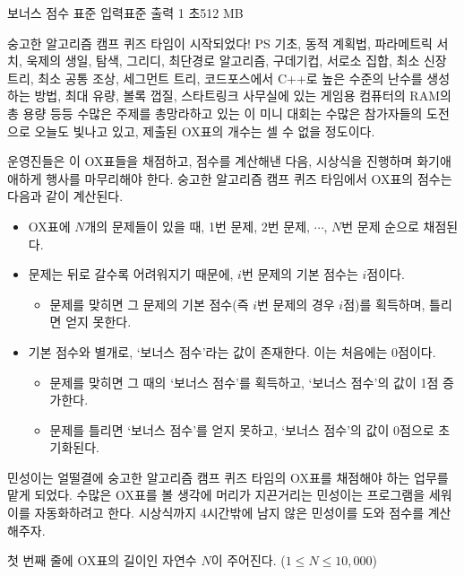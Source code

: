 \begin{problem}{보너스 점수}
    {표준 입력}{표준 출력}
    {1 초}{512 MB}{}
    
    숭고한 알고리즘 캠프 퀴즈 타임이 시작되었다! PS 기초, 동적 계획법, 파라메트릭 서치, 욱제의 생일, 탐색, 그리디, 최단경로 알고리즘, 구데기컵, 서로소 집합, 최소 신장 트리, 최소 공통 조상, 세그먼트 트리, 코드포스에서 C++로 높은 수준의 난수를 생성하는 방법, 최대 유량, 볼록 껍질, 스타트링크 사무실에 있는 게임용 컴퓨터의 RAM의 총 용량 등등 수많은 주제를 총망라하고 있는 이 미니 대회는 수많은 참가자들의 도전으로 오늘도 빛나고 있고, 제출된 OX표의 개수는 셀 수 없을 정도이다.
    
    운영진들은 이 OX표들을 채점하고, 점수를 계산해낸 다음, 시상식을 진행하며 화기애애하게 행사를 마무리해야 한다. 숭고한 알고리즘 캠프 퀴즈 타임에서 OX표의 점수는 다음과 같이 계산된다.
    
    \begin{itemize}
        \item OX표에 $ N $개의 문제들이 있을 때, 1번 문제, 2번 문제, $ \cdots$, $ N $번 문제 순으로 채점된다.
        \item 문제는 뒤로 갈수록 어려워지기 때문에, $ i $번 문제의 기본 점수는 $ i $점이다.
        \begin{itemize}
            \item 문제를 맞히면 그 문제의 기본 점수(즉 $ i $번 문제의 경우 $ i $점)를 획득하며, 틀리면 얻지 못한다.
        \end{itemize}
        \item 기본 점수와 별개로, `보너스 점수'라는 값이 존재한다. 이는 처음에는 0점이다.
        \begin{itemize}
            \item 문제를 맞히면 그 때의 `보너스 점수'를 획득하고, `보너스 점수'의 값이 1점 증가한다.
            \item 문제를 틀리면 `보너스 점수'를 얻지 못하고, `보너스 점수'의 값이 0점으로 초기화된다.
        \end{itemize}
    \end{itemize}
    
    민성이는 얼떨결에 숭고한 알고리즘 캠프 퀴즈 타임의 OX표를 채점해야 하는 업무를 맡게 되었다. 수많은 OX표를 볼 생각에 머리가 지끈거리는 민성이는 프로그램을 세워 이를 자동화하려고 한다. 시상식까지 4시간밖에 남지 않은 민성이를 도와 점수를 계산해주자.
 
    
    \InputFile
    첫 번째 줄에 OX표의 길이인 자연수 $ N $이 주어진다. ($ 1 \leq N \leq 10,000 $)
    

\end{problem}
